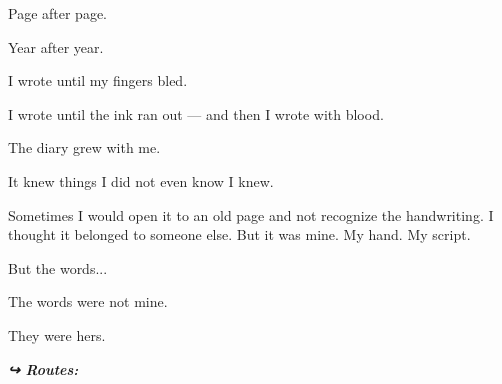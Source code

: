\noindent Page after page.

\noindent Year after year.

\noindent I wrote until my fingers bled.

\noindent I wrote until the ink ran out --- and then I wrote with blood.

\noindent The diary grew with me.

\noindent It knew things I did not even know I knew.

\noindent Sometimes I would open it to an old page and not recognize the handwriting. I thought it belonged to someone else. But it was mine. My hand. My script.

\noindent But the words...

\noindent The words were not mine.

\noindent They were hers.

\vspace{0.5em}
\noindent\textit{\textbf{↪ Routes:}  \rotasep {}}
